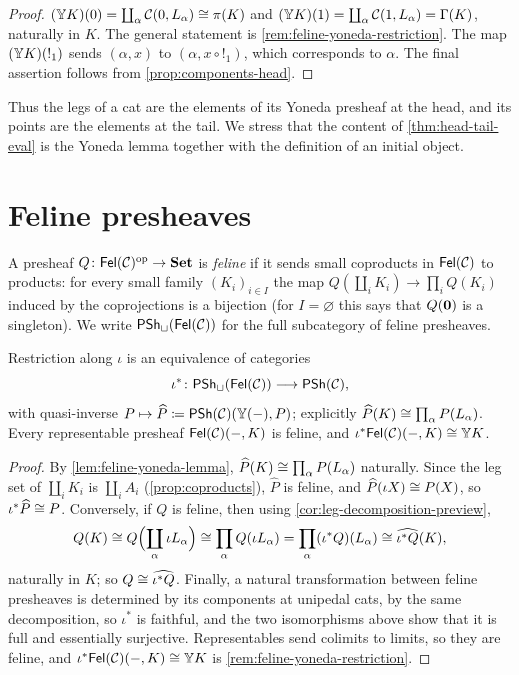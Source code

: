 \begin{proof}
$(\mathbb{Y} K)(0)=\coprod_\alpha\mathcal{C}(0,L_\alpha)\cong\pi(K)$ and
$(\mathbb{Y} K)(1)=\coprod_\alpha\mathcal{C}(1,L_\alpha)=\Gamma(K)$, naturally in $K$. The
general statement is \cref{rem:feline-yoneda-restriction}. The map
$(\mathbb{Y} K)({!_1})$ sends $(\alpha,x)$ to $(\alpha,x\circ{!_1})$, which corresponds
to $\alpha$. The final assertion follows from \cref{prop:components-head}.
\end{proof}

Thus the legs of a cat are the elements of its Yoneda presheaf at the head, and
its points are the elements at the tail. We stress that the content of
\cref{thm:head-tail-eval} is the Yoneda lemma together with the definition of an
initial object.

\section{Feline presheaves}\label{sec:feline-presheaves}

\begin{definition}\label{def:feline-presheaf}
A presheaf $Q\colon\mathsf{Fel}(\mathcal{C})^{\mathrm{op}}\to\mathbf{Set}$ is \emph{feline} if it sends small
coproducts in $\mathsf{Fel}(\mathcal{C})$ to products: for every small family $(K_i)_{i\in I}$
the map $Q(\coprod_iK_i)\to\prod_iQ(K_i)$ induced by the coprojections is a
bijection (for $I=\varnothing$ this says that $Q(\mathbf{0})$ is a singleton).
We write $\mathsf{PSh}_{\sqcup}(\mathsf{Fel}(\mathcal{C}))$ for the full subcategory of feline presheaves.
\end{definition}

\begin{theorem}\label{thm:coproduct-presheaves}
Restriction along $\iota$ is an equivalence of categories
\[
\iota^*\colon\mathsf{PSh}_{\sqcup}(\mathsf{Fel}(\mathcal{C}))\longrightarrow\mathsf{PSh}(\mathcal{C}),
\]
with quasi-inverse $P\mapsto\widehat P\coloneqq\mathsf{PSh}(\mathcal{C})(\mathbb{Y}(-),P)$; explicitly
$\widehat P(K)\cong\prod_{\alpha}P(L_\alpha)$. Every representable presheaf
$\mathsf{Fel}(\mathcal{C})(-,K)$ is feline, and $\iota^*\mathsf{Fel}(\mathcal{C})(-,K)\cong\mathbb{Y} K$.
\end{theorem}

\begin{proof}
By \cref{lem:feline-yoneda-lemma}, $\widehat P(K)\cong\prod_\alpha P(L_\alpha)$
naturally. Since the leg set of $\coprod_iK_i$ is $\coprod_iA_i$
(\cref{prop:coproducts}), $\widehat P$ is feline, and
$\widehat P(\iota X)\cong P(X)$, so $\iota^*\widehat P\cong P$. Conversely, if
$Q$ is feline, then using \cref{cor:leg-decomposition-preview},
\[
Q(K)\cong Q\Bigl(\coprod_\alpha\iota L_\alpha\Bigr)\cong\prod_\alpha Q(\iota L_\alpha)=\prod_\alpha(\iota^*Q)(L_\alpha)\cong\widehat{\iota^*Q}(K),
\]
naturally in $K$; so $Q\cong\widehat{\iota^*Q}$. Finally, a natural
transformation between feline presheaves is determined by its components at
unipedal cats, by the same decomposition, so $\iota^*$ is faithful, and the
two isomorphisms above show that it is full and essentially surjective.
Representables send colimits to limits, so they are feline, and
$\iota^*\mathsf{Fel}(\mathcal{C})(-,K)\cong\mathbb{Y} K$ is \cref{rem:feline-yoneda-restriction}.
\end{proof}

